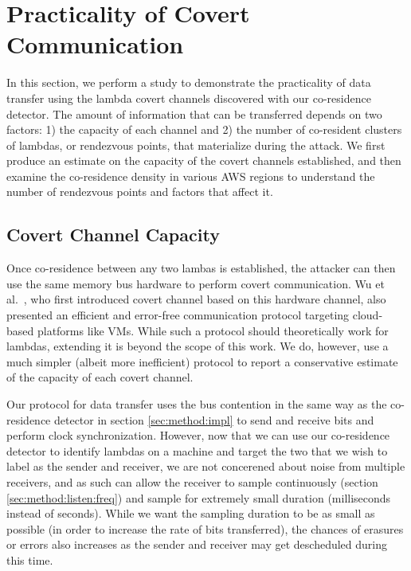 \section{Practicality of Covert Communication}
\label{sec:study}

In this section, we perform a study to demonstrate the practicality of data 
transfer using the lambda covert channels discovered with our co-residence detector.  
The amount of information that can be transferred depends on two factors: 1) the 
capacity of each channel and 2) the number of co-resident clusters of lambdas, 
or rendezvous points, that materialize during the attack.  We first produce an estimate on the
capacity of the covert channels established, and then examine the co-residence
density in various AWS regions to understand the number of rendezvous points and
factors that affect it.

\subsection{Covert Channel Capacity}


Once co-residence between any two lambas is established, the attacker can then
use the same memory bus hardware to perform covert communication. Wu et
al.~\cite{wuusenix2012}, who first introduced covert channel based on this
hardware channel, also presented an efficient and error-free communication
protocol targeting cloud-based platforms like VMs.  While such a protocol should
theoretically work for lambdas, extending it is beyond the scope of this work.
We do, however, use a much simpler (albeit more inefficient) protocol to report
a conservative estimate of the capacity of each covert channel.

Our protocol for data transfer uses the bus contention in the same way as the co-residence
detector in section \ref{sec:method:impl} to send and receive bits and perform clock
synchronization. However, now that we can use our co-residence detector to identify
lambdas on a machine and target the two that we wish to label as the sender and
receiver, we are not concerened about noise from multiple receivers, and as such
can allow the receiver to sample continuously (section \ref{sec:method:listen:freq}) 
and sample for extremely small duration (milliseconds instead of seconds). While we want the
sampling duration to be as small as possible (in order to increase the rate of
bits transferred), the chances of erasures or errors also increases as the
sender and receiver may get descheduled during this time. 

